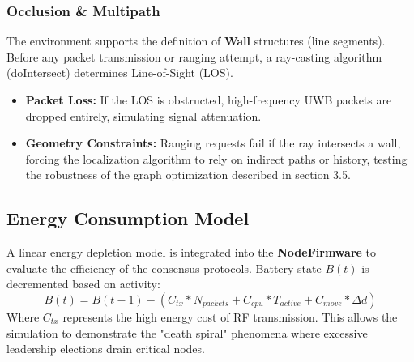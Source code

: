 \subsubsection{Occlusion \& Multipath}
\noindent The environment supports the definition of \textbf{Wall} structures (line segments). Before any packet transmission or ranging attempt, a ray-casting algorithm (doIntersect) determines Line-of-Sight (LOS).
\begin{itemize}
    \item \textbf{Packet Loss:} If the LOS is obstructed, high-frequency UWB packets are dropped entirely, simulating signal attenuation.
    \item \textbf{Geometry Constraints:} Ranging requests fail if the ray intersects a wall, forcing the localization algorithm to rely on indirect paths or history, testing the robustness of the graph optimization described in section 3.5.
\end{itemize}

\subsection{Energy Consumption Model}
\noindent A linear energy depletion model is integrated into the \textbf{NodeFirmware} to evaluate the efficiency of the consensus protocols. Battery state $B(t)$ is decremented based on activity:
\begin{equation}
    B(t) = B(t-1) - (C_{tx} * N_{packets} + C_{cpu} * T_{active} + C_{move} * \Delta d)
\end{equation}
Where $C_{tx}$ represents the high energy cost of RF transmission. This allows the simulation to demonstrate the "death spiral" phenomena where excessive leadership elections drain critical nodes. 
